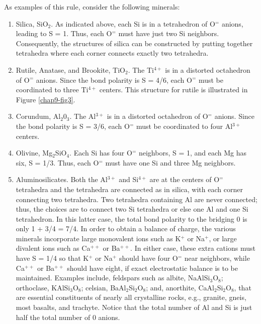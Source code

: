 As examples of this rule, consider the following minerals:
\begin{enumerate}
\item Silica, SiO$_2$. As indicated above, each Si is in a 
tetrahedron of O$^=$ anions, leading to S = 1.  Thus, each O$^=$ must 
have just two Si neighbors. Consequently, the structures of silica
can be constructed by putting together tetrahedra where each corner 
connects exactly two tetrahedra.

\item Rutile, Anatase, and Brookite, TiO$_2$.  The Ti$^{4+}$ 
is in a distorted octahedron of O$^=$ anions.  Since the bond polarity is 
S = 4/6, each O$^=$ must be coordinated to three Ti$^{4+}$ centers.
This structure for rutile is illustrated in Figure \ref{chap9-fig3}.

\item Corundum, Al$_2$0$_3$. The Al$^{3+}$ is in a distorted 
octahedron of O$^=$ anions. Since the
bond polarity is S = 3/6, each O$^=$ must be coordinated to four 
Al$^{3+}$ centers.

\item Olivine, Mg$_2$SiO$_4$.  Each Si has four O$^=$ neighbors, S = 
1, and each Mg has six, S = 1/3. Thus, each O$^=$ must have one Si and 
three Mg neighbors.

\item Aluminosilicates.  Both the Al$^{3+}$ and Si$^{4+}$ are at the 
centers of O$^=$ tetrahedra and the tetrahedra are connected as in silica, 
with each corner connecting two tetrahedra.  Two tetrahedra containing Al 
are never connected; thus, the choices are to connect two Si
tetrahedra or else one Al and one Si tetrahedron.  In this latter case, the 
total bond polarity to the bridging 0 is only 1 + 3/4 = 7/4.  In order to 
obtain a balance of charge, the various minerals incorporate large 
monovalent ions such as K$^+$ or Na$^+$, or large divalent ions such as 
Ca$^{++}$ or Ba$^{++}$. In either case, these extra cations must 
have S = 1/4 so that K$^+$ or Na$^+$ should have four O$^=$ near 
neighbors, while Ca$^{++}$ or Ba$^{++}$ should have eight, if
exact electrostatic balance is to be maintained.  Examples include, feldspars 
such as albite, NaAlSi$_3$O$_8$; orthoclase, KAlSi$_3$O$_8$; celsian, 
BaAl$_2$Si$_2$O$_8$; and, anorthite, CaAl$_2$Si$_2$O$_8$, 
that are essential constituents of nearly all crystalline 
rocks, e.g., granite, gneis, most basalts, and trachyte. Notice that the 
total number of Al and Si is just half the total number of 0 anions.
\end{enumerate}

